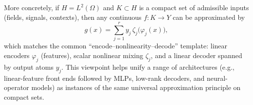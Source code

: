 \documentclass[final,12pt]{colt2026} %
\begin{document}
More concretely, if $H=L^2(\Omega)$ and $K\subset H$ is a compact set of admissible inputs (fields, signals, contexts), then any continuous $f\colon K\to Y$ can be approximated by
\[
  g(x)=\sum_{j=1}^r y_j\,\zeta_j\bigl(\varphi_j(x)\bigr),
\]
which matches the common ``encode--nonlinearity--decode'' template: linear encoders $\varphi_j$ (features), scalar nonlinear mixing $\zeta_j$, and a linear decoder spanned by output atoms $y_j$.
This viewpoint helps unify a range of architectures (e.g., linear-feature front ends followed by MLPs, low-rank decoders, and neural-operator models) as instances of the same universal approximation principle on compact sets.






\end{document}
